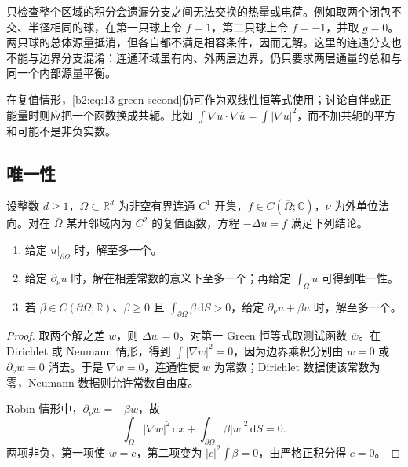 只检查整个区域的积分会遗漏分支之间无法交换的热量或电荷。例如取两个闭包不交、半径相同的球，在第一只球上令 \(f=1\)，第二只球上令 \(f=-1\)，并取 \(g=0\)。两只球的总体源量抵消，但各自都不满足相容条件，因而无解。这里的连通分支也不能与边界分支混淆：连通环域虽有内、外两层边界，仍只要求两层通量的总和与同一个内部源量平衡。

\ProseParagraphBreak

在复值情形，\eqref{b2:eq:13-green-second}仍可作为双线性恒等式使用；讨论自伴或正能量时则应把一个函数换成共轭。比如 \(\int\nabla u\cdot\nabla\overline u=\int|\nabla u|^2\)，而不加共轭的平方和可能不是非负实数。

\subsection{唯一性}
\label{b2:subsec:130203}

\begin{theorem}[三类边界条件下的唯一性]\label{b2:thm:13-boundary-uniqueness}
设整数 \(d\geq1\)，\(\Omega\subset\mathbb R^d\) 为非空有界连通 \(C^1\) 开集，\(f\in C(\overline\Omega;\mathbb C)\)，\(\nu\) 为外单位法向。对在 \(\overline\Omega\) 某开邻域内为 \(C^2\) 的复值函数，方程 \(-\Delta u=f\) 满足下列结论。
\begin{enumerate}
\item\label{b2:item:13-unique-dirichlet}给定 \(u|_{\partial\Omega}\) 时，解至多一个。
\item\label{b2:item:13-unique-neumann}给定 \(\partial_\nu u\) 时，解在相差常数的意义下至多一个；再给定 \(\int_\Omega u\) 可得到唯一性。
\item\label{b2:item:13-unique-robin}若 \(\beta\in C(\partial\Omega;\mathbb R)\)、\(\beta\geq0\) 且 \(\int_{\partial\Omega}\beta\,\mathrm{d}S>0\)，给定 \(\partial_\nu u+\beta u\) 时，解至多一个。
\end{enumerate}
\end{theorem}
\begin{proof}
取两个解之差 \(w\)，则 \(\Delta w=0\)。对第一 Green 恒等式取测试函数 \(\overline w\)。在 Dirichlet 或 Neumann 情形，得到 \(\int|\nabla w|^2=0\)，因为边界乘积分别由 \(w=0\) 或 \(\partial_\nu w=0\) 消去。于是 \(\nabla w=0\)，连通性使 \(w\) 为常数；Dirichlet 数据使该常数为零，Neumann 数据则允许常数自由度。

Robin 情形中，\(\partial_\nu w=-\beta w\)，故
\[
 \int_\Omega|\nabla w|^2\,\mathrm{d}x
 +\int_{\partial\Omega}\beta|w|^2\,\mathrm{d}S=0.
\]
两项非负，第一项使 \(w=c\)，第二项变为 \(|c|^2\int\beta=0\)，由严格正积分得 \(c=0\)。
\end{proof}

